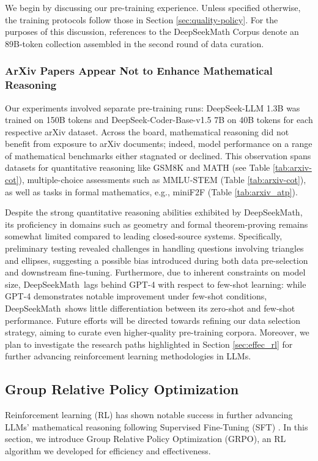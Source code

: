 We begin by discussing our pre-training experience. Unless specified otherwise, the training protocols follow those in Section \ref{sec:quality-policy}. For the purposes of this discussion, references to the DeepSeekMath Corpus denote an 89B-token collection assembled in the second round of data curation.

\subsubsection{ArXiv Papers Appear Not to Enhance Mathematical Reasoning}

Our experiments involved separate pre-training runs: DeepSeek-LLM 1.3B was trained on 150B tokens and DeepSeek-Coder-Base-v1.5 7B on 40B tokens for each respective arXiv dataset. Across the board, mathematical reasoning did not benefit from exposure to arXiv documents; indeed, model performance on a range of mathematical benchmarks either stagnated or declined. This observation spans datasets for quantitative reasoning like GSM8K and MATH (see Table \ref{tab:arxiv-cot}), multiple-choice assessments such as MMLU-STEM (Table \ref{tab:arxiv-cot}), as well as tasks in formal mathematics, e.g., miniF2F (Table \ref{tab:arxiv_atp}).

Despite the strong quantitative reasoning abilities exhibited by DeepSeekMath, its proficiency in domains such as geometry and formal theorem-proving remains somewhat limited compared to leading closed-source systems. Specifically, preliminary testing revealed challenges in handling questions involving triangles and ellipses, suggesting a possible bias introduced during both data pre-selection and downstream fine-tuning. Furthermore, due to inherent constraints on model size, DeepSeekMath~lags behind GPT-4 with respect to few-shot learning: while GPT-4 demonstrates notable improvement under few-shot conditions, DeepSeekMath~shows little differentiation between its zero-shot and few-shot performance. Future efforts will be directed towards refining our data selection strategy, aiming to curate even higher-quality pre-training corpora. Moreover, we plan to investigate the research paths highlighted in Section \ref{sec:effec_rl} for further advancing reinforcement learning methodologies in LLMs.

\subsection{Group Relative Policy Optimization}
Reinforcement learning (RL) has shown notable success in further advancing LLMs’ mathematical reasoning following Supervised Fine-Tuning (SFT) \citep{wang2023math,wizardmath}. In this section, we introduce Group Relative Policy Optimization (GRPO), an RL algorithm we developed for efficiency and effectiveness.

